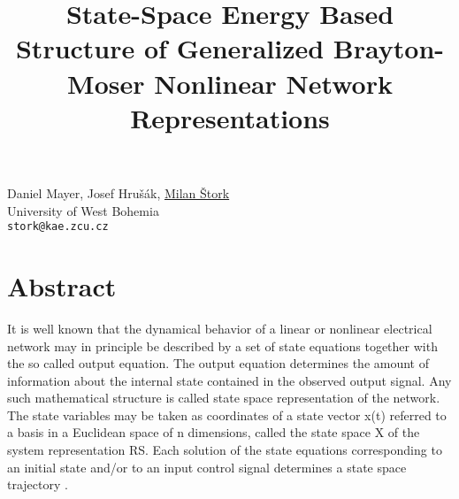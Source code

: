 \title{State-Space Energy Based Structure of Generalized Brayton-Moser Nonlinear Network Representations}
\author{}  \institute{}
\maketitle
\begin{center}
{\large Daniel Mayer, Josef Hru\v{s}\'{a}k, \underline{Milan \v{S}tork}}\\
University of West Bohemia\\
{\tt stork@kae.zcu.cz}

\end{center}

\section*{Abstract}

It is well known that the dynamical behavior of a linear or nonlinear electrical network may in principle be described by a set of state equations together with the so called output equation. The output equation determines the amount of information about the internal state contained in the observed output signal. Any such mathematical structure is called state space representation of the network. The state variables may be taken as coordinates of a state vector x(t) referred to a basis in a Euclidean space of n dimensions, called the state space X of the system representation R{S}. Each solution of the state equations corresponding to an initial state and/or to an input control signal determines a state space trajectory \cite{kalman}. 

